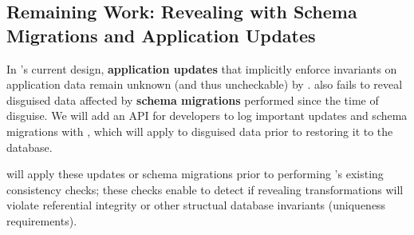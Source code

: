 \subsection{Remaining Work: Revealing with Schema Migrations and Application
Updates}

In \sys's current design, \textbf{application updates} that implicitly enforce
invariants on application data remain unknown (and thus uncheckable) by \sys.
\sys also fails to reveal disguised data affected by \textbf{schema migrations}
performed since the time of disguise.
%
We will add an API for developers to log important updates and schema migrations with \sys, which \sys will apply to disguised data prior to restoring it to the database.

\sys will apply these updates or schema migrations prior to performing \sys's
existing consistency checks; these checks enable \sys to detect if revealing
transformations will violate referential integrity or other structual database
invariants (\eg uniqueness requirements). 
